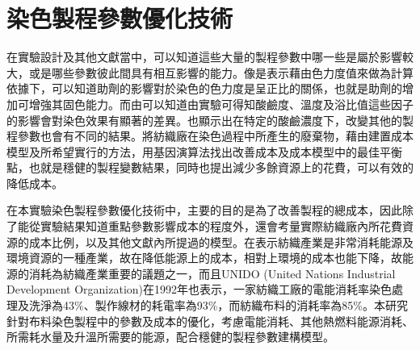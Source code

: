 \section{染色製程參數優化技術}
\label{c:ch2.2}
在實驗設計及其他文獻當中，可以知道這些大量的製程參數中哪一些是屬於影響較大，或是哪些參數彼此間具有相互影響的能力。像是\cite{Guo.etc}表示藉由色力度值來做為計算依據下，可以知道助劑的影響對於染色的色力度是呈正比的關係，也就是助劑的增加可增強其固色能力。而由\cite{Wang.etc}可以知道由實驗可得知酸鹼度、溫度及浴比值這些因子的影響會對染色效果有顯著的差異。也顯示出在特定的酸鹼濃度下，改變其他的製程參數也會有不同的結果。\cite{Wu.etc}將紡織廠在染色過程中所產生的廢棄物，藉由建置成本模型及所希望實行的方法，用基因演算法找出改善成本及成本模型中的最佳平衡點，也就是穩健的製程變數結果，同時也提出減少多餘資源上的花費，可以有效的降低成本。

在本實驗染色製程參數優化技術中，主要的目的是為了改善製程的總成本，因此除了能從實驗結果知道重點參數影響成本的程度外，還會考量實際紡織廠內所花費資源的成本比例，以及其他文獻內所提過的模型。在\cite{Palamutcu}表示紡織產業是非常消耗能源及環境資源的一種產業，故在降低能源上的成本，相對上環境的成本也能下降，故能源的消耗為紡織產業重要的議題之一，而且UNIDO (United Nations Industrial Development Organization)在1992年也表示，一家紡織工廠的電能消耗率染色處理及洗淨為43\%、製作線材的耗電率為93\%，而紡織布料的消耗率為85\%。本研究針對布料染色製程中的參數及成本的優化，考慮電能消耗、其他熱燃料能源消耗、所需耗水量及升溫所需要的能源，配合穩健的製程參數建構模型。